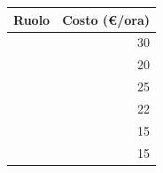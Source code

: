 \documentclass[12pt,a4paper]{article}
\begin{document}
\begin{table}[H]
	\begin{center}
		\begin{tabular}{l r}
			\toprule
            \textbf{Ruolo}	& \textbf{Costo (\euro/ora)} \\ \midrule
			\midrule
            \RE{} & 30 \\ \midrule
            \AM{} & 20 \\ \midrule
            \AN{} & 25 \\ \midrule
            \PG{} & 22 \\ \midrule
            \PR{} & 15 \\ \midrule
            \VR{} & 15 \\
			\bottomrule
		\end{tabular}
	\end{center}
\end{table}
\end{document}
